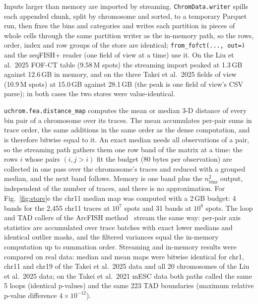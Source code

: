 \documentclass[11pt]{article}
\newcommand{\pkg}[1]{\texttt{#1}}
\begin{document}
Inputs larger than memory are imported by streaming.
\pkg{ChromData.writer} spills each appended chunk, split by chromosome and sorted, to a temporary Parquet run, then fixes the bins and categories and writes each partition in pieces of whole cells through the same partition writer as the in-memory path, so the rows, order, index and row groups of the store are identical; \pkg{from\_fofct(..., out=)} and the seqFISH+ reader (one field of view at a time) use it.
On the Liu et al.\ 2025 FOF-CT table (9.58\,M spots) the streaming import peaked at 1.3\,GB against 12.6\,GB in memory, and on the three Takei et al.\ 2025 fields of view (10.9\,M spots) at 15.0\,GB against 28.1\,GB (the peak is one field of view's CSV parse); in both cases the two stores were value-identical.

\pkg{uchrom.fea.distance\_map} computes the mean or median 3-D distance of every bin pair of a chromosome over its traces.
The mean accumulates per-pair sums in trace order, the same additions in the same order as the dense computation, and is therefore bitwise equal to it.
An exact median needs all observations of a pair, so the streaming path gathers them one row band of the matrix at a time: the rows $i$ whose pairs $(i, j>i)$ fit the budget (80 bytes per observation) are collected in one pass over the chromosome's traces and reduced with a grouped median, and the next band follows.
Memory is one band plus the $n_\mathrm{bins}^2$ output, independent of the number of traces, and there is no approximation.
For Fig.~\ref{fig:store}e the chr11 median map was computed with a 2\,GB budget: 4 bands for the 2,455 chr11 traces at $10^{7}$ spots and 31 bands at $10^{8}$ spots.
The loop and TAD callers of the ArcFISH method~\citep{arcfish} stream the same way: per-pair axis statistics are accumulated over trace batches with exact lower medians and identical outlier masks, and the filtered variances equal the in-memory computation up to summation order.
Streaming and in-memory results were compared on real data: median and mean maps were bitwise identical for chr1, chr11 and chr19 of the Takei et al.\ 2025 data and all 20 chromosomes of the Liu et al.\ 2025 data; on the Takei et al.\ 2021 mESC data both paths called the same 5 loops (identical p-values) and the same 223 TAD boundaries (maximum relative p-value difference $4\times10^{-12}$).
\end{document}
